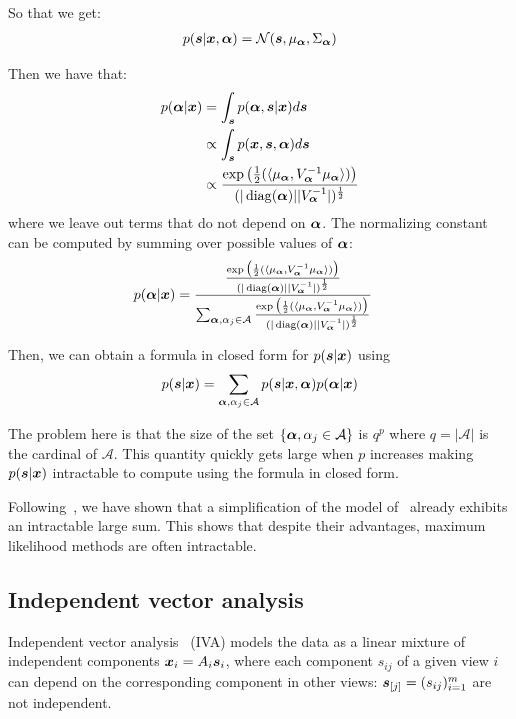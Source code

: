So that we get:
\begin{align}
  p(\boldsymbol{s} | \boldsymbol{x}, \boldsymbol{\alpha}) =  \mathcal{N}(\boldsymbol{s}, \mu_{\boldsymbol{\alpha}}, \Sigma_{\boldsymbol{\alpha}})
\end{align}

Then we have that:
\begin{align}
  p(\boldsymbol{\alpha} | \boldsymbol{x}) &= \int_{\boldsymbol{s}} p(\boldsymbol{\alpha}, \boldsymbol{s} | \boldsymbol{x}) d\boldsymbol{s} \\
                    &\propto \int_{\boldsymbol{s}} p(\boldsymbol{x}, \boldsymbol{s} ,\boldsymbol{\alpha}) d\boldsymbol{s} \\ 
                   &\propto \frac{\exp\big(\frac12(\langle{ \mu_{\boldsymbol{\alpha}} },{V_{\boldsymbol{\alpha}}^{-1} \mu_{\boldsymbol{\alpha}} }\rangle) \big)}{(|\operatorname*{diag}(\boldsymbol{\alpha})| |V_{\boldsymbol{\alpha}}^{-1}|)^{\frac12}}\\ 
\end{align}
where we leave out terms that do not depend on $\boldsymbol{\alpha}$.
The normalizing constant can be computed by summing over possible values of
$\boldsymbol{\alpha}$:
\begin{align}
  p(\boldsymbol{\alpha} | \boldsymbol{x}) &= \frac{\frac{\exp\big(\frac12(\langle{ \mu_{\boldsymbol{\alpha}} },{V_{\boldsymbol{\alpha}}^{-1} \mu_{\boldsymbol{\alpha}} }\rangle) \big)}{(|\operatorname*{diag}(\boldsymbol{\alpha})| |V_{\boldsymbol{\alpha}}^{-1}|)^{\frac12}}}{\sum_{\boldsymbol{\alpha}, \alpha_j \in \mathcal{A}} \frac{\exp\big(\frac12(\langle{ \mu_{\boldsymbol{\alpha}} },{V_{\boldsymbol{\alpha}}^{-1} \mu_{\boldsymbol{\alpha}} }\rangle) \big)}{(|\operatorname*{diag}(\boldsymbol{\alpha})| |V_{\boldsymbol{\alpha}}^{-1}|)^{\frac12}}}
\end{align}

Then, we can obtain a formula in closed form for $p(\boldsymbol{s} | \boldsymbol{x})$ using
\begin{align}
  p(\boldsymbol{s} | \boldsymbol{x}) = \sum_{\boldsymbol{\alpha}, \alpha_j \in \mathcal{A}} p(\boldsymbol{s} | \boldsymbol{x}, \boldsymbol{\alpha}) p(\boldsymbol{\alpha} | \boldsymbol{x})
\end{align}

The problem here is that the size of the set $\{\boldsymbol{\alpha}, \alpha_j \in
\mathcal{A} \}$ is $q^p$ where $q=|\mathcal{A}|$ is the cardinal of
$\mathcal{A}$. This quantity quickly gets large when $p$ increases making
$p(\boldsymbol{s} | \boldsymbol{x})$ intractable to compute using the formula in closed form.

Following~\cite{moulines1997maximum}, we have shown that a simplification of the
model of~\cite{guo2008unified} already exhibits an intractable large sum. This
shows that despite their advantages, maximum likelihood methods are often intractable.



\subsection{Independent vector analysis}
\label{sec:IVA}
Independent vector analysis~\cite{lee2008independent} (IVA) models the data as a
linear mixture of independent components $\boldsymbol{x}_i = A_i \boldsymbol{s}_i$, where each
component $s_{ij}$ of a given view $i$ can depend on the corresponding component
in other views: $\boldsymbol{s}_{[j]} = (s_{ij})_{i=1}^m$ are not independent.

